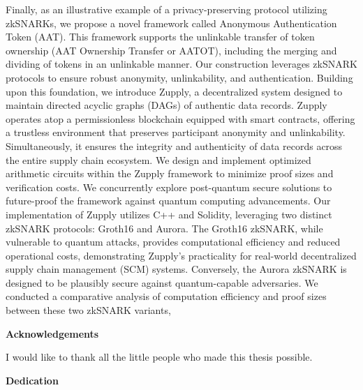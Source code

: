 Finally, as an illustrative example of a privacy-preserving protocol utilizing zkSNARKs, we propose a novel framework called Anonymous Authentication Token (AAT). This framework supports the unlinkable transfer of token ownership (AAT Ownership Transfer or AATOT), including the merging and dividing of tokens in an unlinkable manner. Our construction leverages zkSNARK protocols to ensure robust anonymity, unlinkability, and authentication. Building upon this foundation, we introduce Zupply, a decentralized system designed to maintain directed acyclic graphs (DAGs) of authentic data records. Zupply operates atop a permissionless blockchain equipped with smart contracts, offering a trustless environment that preserves participant anonymity and unlinkability. Simultaneously, it ensures the integrity and authenticity of data records across the entire supply chain ecosystem. We design and implement optimized arithmetic circuits within the Zupply framework to minimize proof sizes and verification costs. We concurrently explore post-quantum secure solutions to future-proof the framework against quantum computing advancements. Our implementation of Zupply utilizes C++ and Solidity, leveraging two distinct zkSNARK protocols: Groth16 and Aurora. The Groth16 zkSNARK, while vulnerable to quantum attacks, provides computational efficiency and reduced operational costs, demonstrating Zupply’s practicality for real-world decentralized supply chain management (SCM) systems. Conversely, the Aurora zkSNARK is designed to be plausibly secure against quantum-capable adversaries. We conducted a comparative analysis of computation efficiency and proof sizes between these two zkSNARK variants,






\cleardoublepage
{}    %

\begin{center}\textbf{Acknowledgements}\end{center}

I would like to thank all the little people who made this thesis possible.
\cleardoublepage
{}    %

\begin{center}\textbf{Dedication}\end{center}

